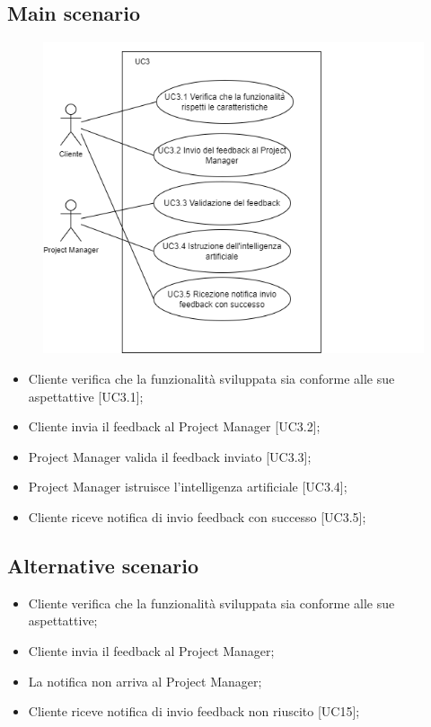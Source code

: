 \documentclass{article}
\begin{document}
    \subsection*{Main scenario}
        \begin{figure}[h]
            \centering
            \includegraphics{./imgUML/UC3-zoom.png}
            \label{fig:immagine}
        \end{figure}
        \begin{itemize}
            \item Cliente verifica che la funzionalità sviluppata sia conforme alle sue aspettattive [UC3.1];
            \item Cliente invia il feedback al Project Manager [UC3.2];
            \item Project Manager valida il feedback inviato [UC3.3];
            \item Project Manager istruisce l'intelligenza artificiale [UC3.4];
            \item Cliente riceve notifica di invio feedback con successo [UC3.5];
        \end{itemize}
        
    \subsection*{Alternative scenario}
    \begin{itemize}
        \item Cliente verifica che la funzionalità sviluppata sia conforme alle sue aspettattive;
        \item Cliente invia il feedback al Project Manager;
        \item La notifica non arriva al Project Manager;
        \item Cliente riceve notifica di invio feedback non riuscito [UC15];
    \end{itemize}
      
\end{document}
